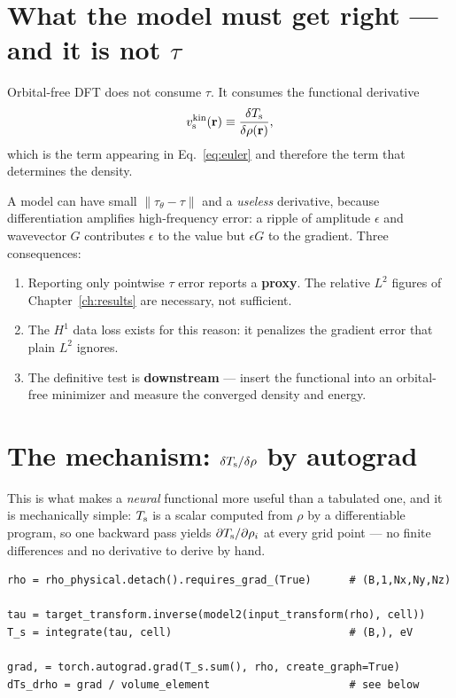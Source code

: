 \section{What the model must get right --- and it is not \texorpdfstring{$\tau$}{tau}}
\label{sec:notthetau}

Orbital-free DFT does not consume $\tau$. It consumes the functional
derivative
\begin{equation}
  v^{\mathrm{kin}}_{\mathrm{s}}(\mathbf{r}) \equiv \frac{\delta T_{\mathrm{s}}}{\delta\rho(\mathbf{r})},
\end{equation}
which is the term appearing in Eq.~\eqref{eq:euler} and therefore the term that
determines the density.

A model can have small $\lVert\tau_\theta-\tau\rVert$ and a \emph{useless}
derivative, because differentiation amplifies high-frequency error: a ripple of
amplitude $\epsilon$ and wavevector $G$ contributes $\epsilon$ to the value but
$\epsilon G$ to the gradient. Three consequences:

\begin{enumerate}
  \item Reporting only pointwise $\tau$ error reports a \textbf{proxy}. The
    relative $L^2$ figures of Chapter~\ref{ch:results} are necessary, not
    sufficient.
  \item The $H^1$ data loss exists for this reason: it penalizes the gradient
    error that plain $L^2$ ignores.
  \item The definitive test is \textbf{downstream} --- insert the functional
    into an orbital-free minimizer and measure the converged density and energy.
\end{enumerate}

\section{The mechanism: \texorpdfstring{$\delta T_{\mathrm{s}}/\delta\rho$}{dTs/drho} by autograd}
\label{sec:autograd}

This is what makes a \emph{neural} functional more useful than a tabulated one,
and it is mechanically simple: $T_{\mathrm{s}}$ is a scalar computed from $\rho$ by a
differentiable program, so one backward pass yields
$\partial T_{\mathrm{s}}/\partial\rho_i$ at every grid point --- no finite differences and
no derivative to derive by hand.

\begin{lstlisting}
rho = rho_physical.detach().requires_grad_(True)      # (B,1,Nx,Ny,Nz)

tau = target_transform.inverse(model2(input_transform(rho), cell))
T_s = integrate(tau, cell)                            # (B,), eV

grad, = torch.autograd.grad(T_s.sum(), rho, create_graph=True)
dTs_drho = grad / volume_element                      # see below
\end{lstlisting}

